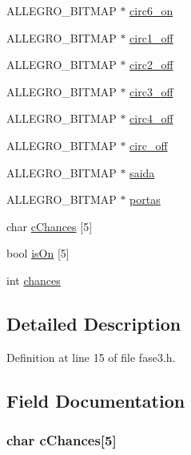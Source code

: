 \begin{DoxyCompactItemize}
A\-L\-L\-E\-G\-R\-O\-\_\-\-B\-I\-T\-M\-A\-P $\ast$ \hyperlink{struct_level_tres_aa380bab7c5e4a7793500bc4563c4a6bd}{circ6\-\_\-on}
\item 
A\-L\-L\-E\-G\-R\-O\-\_\-\-B\-I\-T\-M\-A\-P $\ast$ \hyperlink{struct_level_tres_a61973bafd11ab9dea9306731297f4728}{circ1\-\_\-off}
\item 
A\-L\-L\-E\-G\-R\-O\-\_\-\-B\-I\-T\-M\-A\-P $\ast$ \hyperlink{struct_level_tres_a384448f3d672f70b70b1bf454cb46e50}{circ2\-\_\-off}
\item 
A\-L\-L\-E\-G\-R\-O\-\_\-\-B\-I\-T\-M\-A\-P $\ast$ \hyperlink{struct_level_tres_a91273d7098df87dd93c9f9a10b62ed08}{circ3\-\_\-off}
\item 
A\-L\-L\-E\-G\-R\-O\-\_\-\-B\-I\-T\-M\-A\-P $\ast$ \hyperlink{struct_level_tres_a0d68273ce8ab1dd896de20c68c3e2de0}{circ4\-\_\-off}
\item 
A\-L\-L\-E\-G\-R\-O\-\_\-\-B\-I\-T\-M\-A\-P $\ast$ \hyperlink{struct_level_tres_ac4adb5152cb42a0bc363375e1ad17229}{circ\-\_\-off}
\item 
A\-L\-L\-E\-G\-R\-O\-\_\-\-B\-I\-T\-M\-A\-P $\ast$ \hyperlink{struct_level_tres_a94c49a6b9d708df64de4deb034ca5b10}{saida}
\item 
A\-L\-L\-E\-G\-R\-O\-\_\-\-B\-I\-T\-M\-A\-P $\ast$ \hyperlink{struct_level_tres_a6c47128335a6e9846fb9576bace5a597}{portas}
\item 
char \hyperlink{struct_level_tres_a99c6457b8978aa19c3200041fea2279e}{c\-Chances} \mbox{[}5\mbox{]}
\item 
bool \hyperlink{struct_level_tres_a59f6fe985ed5513f62660b2926c812aa}{is\-On} \mbox{[}5\mbox{]}
\item 
int \hyperlink{struct_level_tres_a654217f8a02c11b0a494d8db3c912d7a}{chances}
\end{DoxyCompactItemize}


\subsection{Detailed Description}


Definition at line 15 of file fase3.\-h.



\subsection{Field Documentation}
\hypertarget{struct_level_tres_a99c6457b8978aa19c3200041fea2279e}{
\subsubsection[{c\-Chances}]{\setlength{\rightskip}{0pt plus 5cm}char c\-Chances\mbox{[}5\mbox{]}}}\label{struct_level_tres_a99c6457b8978aa19c3200041fea2279e}


